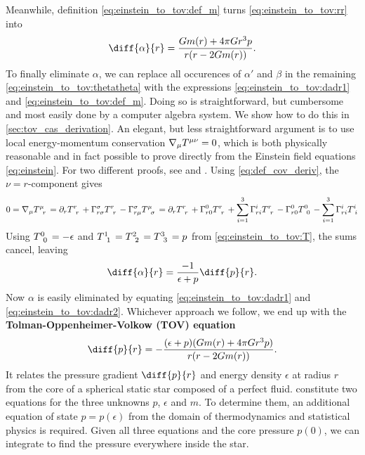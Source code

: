 \documentclass[a4paper,11pt,twoside]{report}
\begin{document}
Meanwhile, definition \eqref{eq:einstein_to_tov:def_m} turns \cref{eq:einstein_to_tov:rr} into
\begin{equation}
	\diff{\alpha}{r} = \frac{G m(r) + 4 \pi G r^3 p}{r (r - 2 G m(r))} .
	\label{eq:einstein_to_tov:dadr1}
\end{equation}
To finally eliminate $\alpha$, we can replace all occurences of $\alpha'$ and $\beta$ in the remaining \cref{eq:einstein_to_tov:thetatheta} with the expressions \eqref{eq:einstein_to_tov:dadr1} and \eqref{eq:einstein_to_tov:def_m}.
Doing so is straightforward, but cumbersome and most easily done by a computer algebra system.
We show how to do this in \cref{sec:tov_cas_derivation}.
An elegant, but less straightforward argument is to use local energy-momentum conservation $\nabla_\mu T\indices{^\mu^\nu} = 0$, which is both physically reasonable and in fact possible to prove directly from the Einstein field equations \eqref{eq:einstein}.
For two different proofs, see \cite{ref:einstein_conservation_energy_momentum} and \cite{ref:mika_gr_notes}.
Using \cref{eq:def_cov_deriv}, the $\nu=r$-component gives
\begin{equation*}
	0
	= \nabla_\mu T\indices{^\mu_r}
	= \partial_r T\indices{^r_r} + \Gamma^\sigma_{r \sigma} T\indices{^r_r} - \Gamma^\sigma_{r \mu} T\indices{^\mu_\sigma}
	= \partial_r T\indices{^r_r} + \Gamma^0_{r0} T\indices{^r_r} + \sum_{i=1}^3 \Gamma^i_{ri} T\indices{^r_r} - \Gamma^0_{r0} T\indices{^0_0} - \sum_{i=1}^3 \Gamma^i_{ri} T\indices{^i_i}
\end{equation*}
Using $T\indices{^0_0} = -\epsilon$ and $T\indices{^1_1} = T\indices{^2_2} = T\indices{^3_3} = p$ from \cref{eq:einstein_to_tov:T}, the sums cancel, leaving
\begin{equation}
	\diff{\alpha}{r} = \frac{-1}{\epsilon+p} \diff{p}{r} .
	\label{eq:einstein_to_tov:dadr2}
\end{equation}
Now $\alpha$ is easily eliminated by equating \eqref{eq:einstein_to_tov:dadr1} and \eqref{eq:einstein_to_tov:dadr2}. 
Whichever approach we follow, we end up with the \textbf{Tolman-Oppenheimer-Volkow (TOV) equation}
\begin{equation}
	\diff{p}{r} = -\frac{(\epsilon+p) (G m(r) + 4 \pi G r^3 p)}{r (r - 2 G m(r))} .
	\label{eq:tov}
\end{equation}
It relates the pressure gradient $\diff{p}{r}$ and energy density $\epsilon$ at radius $r$ from the core of a spherical static star composed of a perfect fluid.
 constitute two equations for the three unknowns $p$, $\epsilon$ and $m$.
To determine them, an additional equation of state $p = p(\epsilon)$ from the domain of thermodynamics and statistical physics is required.
Given all three equations and the core pressure $p(0)$, we can integrate to find the pressure everywhere inside the star.
\end{document}
